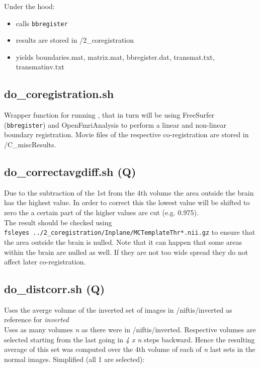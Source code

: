 \documentclass[12pt,a4paper]{scrartcl}
\begin{document}
\noindent Under the hood:
\begin{itemize}
\item calls \texttt{bbregister}
\item results are stored in /2\_coregistration
\item yields boundaries.mat, matrix.mat, bbregister.dat, transmat.txt, transmatinv.txt
\end{itemize}

\subsection{do\_coregistration.sh}
\label{sh:coreg}
Wrapper function for running \texttt{}, that in turn will be using FreeSurfer (\texttt{bbregister}) and OpenFmriAnalysis to perform a linear and non-linear boundary registration.  Movie files of the respective co-registration are stored in /C\_miscResults.\\

\subsection{do\_correctavgdiff.sh (Q)}
\label{sh:corravg}
Due to the subtraction of the 1st from the 4th volume the area outside the brain has the highest value. In order to correct this the lowest value will be shifted to zero the a certain part of the higher values are cut (e.g. 0.975).\\

\noindent The result should be checked using\\
\texttt{fsleyes ../2\_coregistration/Inplane/MCTemplateThr*.nii.gz} to ensure that the area outside the brain is nulled. Note that it can happen that some areas within the brain are nulled as well. If they are not too wide spread they do not affect later co-registration.\\

\subsection{do\_distcorr.sh (Q)}
\label{sh:distcorr}
Uses the averge volume of the inverted set of images in /niftis/inverted as reference for \textit{inverted}\\

\noindent Uses as many volumes \textit{n} as there were in /niftis/inverted. Respective volumes are selected starting from the last going in \textit{4 x n} steps backward. Hence the resulting average of this set was computed over the 4th volume of each of \textit{n} last sets in the normal images. Simplified (all 1 are selected):\\
\end{document}
